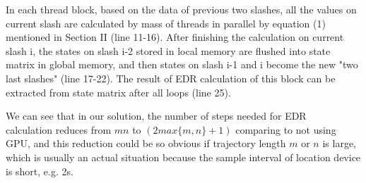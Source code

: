 \documentclass[conference]{IEEEtran}
\begin{document}
In each thread block, based on the data of previous two slashes, all the values on current slash are calculated by mass of threads in parallel by equation (1) mentioned in Section II (line 11-16). After finishing the calculation on current slash i, the states on slash i-2 stored in local memory are flushed into state matrix in global memory, and then states on slash i-1 and i become the new "two last slashes" (line 17-22). The result of EDR calculation of this block can be extracted from state matrix after all loops (line 25). 

We can see that in our solution, the number of steps needed for EDR　calculation reduces from $mn$ to $(2max\{m,n\}+1)$ comparing to not using GPU, and this reduction could be so obvious if trajectory length $m$ or $n$ is large, which is usually an actual situation because the sample interval of location device is short, e.g. 2s.

\end{document}
